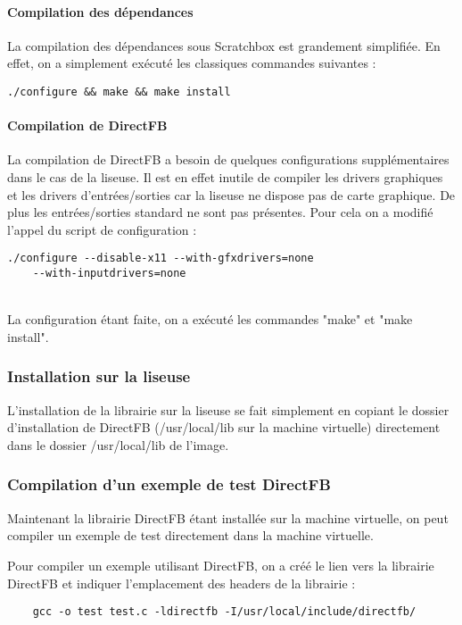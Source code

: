 \paragraph{Compilation des dépendances \\}

La compilation des dépendances sous Scratchbox est grandement simplifiée. En effet, on a simplement exécuté les classiques commandes suivantes : 
	\begin{lstlisting}
./configure && make && make install
	\end{lstlisting}

\paragraph{Compilation de DirectFB \\}

La compilation de DirectFB a besoin de quelques configurations supplémentaires dans le cas de la liseuse. Il est en effet inutile de compiler les drivers graphiques et les drivers d'entrées/sorties car la liseuse ne dispose pas de carte graphique. De plus les entrées/sorties standard ne sont pas présentes.
Pour cela on a modifié l'appel du script de configuration : 
\begin{lstlisting}
./configure --disable-x11 --with-gfxdrivers=none 
	--with-inputdrivers=none
\end{lstlisting}
~\\
La configuration étant faite, on a exécuté les commandes "make" et "make install".

\subsubsection{Installation sur la liseuse}

L'installation de la librairie sur la liseuse se fait simplement en copiant le dossier d'installation de DirectFB 
(/usr/local/lib sur la machine virtuelle) directement dans le dossier /usr/local/lib de l'image.

\subsubsection{Compilation d'un exemple de test DirectFB}

Maintenant la librairie DirectFB étant installée sur la machine virtuelle, on peut compiler un exemple de test directement dans la machine virtuelle.

Pour compiler un exemple utilisant DirectFB, on a créé le lien vers la librairie DirectFB et indiquer l'emplacement des headers de la librairie : 
\begin{lstlisting}
	gcc -o test test.c -ldirectfb -I/usr/local/include/directfb/
\end{lstlisting}

